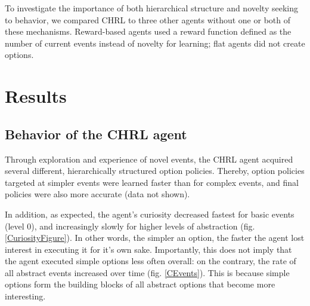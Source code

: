 \documentclass{article}
\begin{document}
To investigate the importance of both hierarchical structure and novelty seeking to behavior, we compared CHRL to three other agents without one or both of these mechanisms. Reward-based agents used a reward function defined as the number of current events instead of novelty for learning; flat agents did not create options.%


\section{Results}

\subsection{Behavior of the CHRL agent} \label{Results CHRL}

Through exploration and experience of novel events, the CHRL agent acquired several different, hierarchically structured option policies. Thereby, option policies targeted at simpler events were learned faster than for complex events, and final policies were also more accurate (data not shown).

In addition, as expected, the agent's curiosity decreased fastest for basic events (level 0), and increasingly slowly for higher levels of abstraction (fig. \ref{CuriosityFigure}). In other words, the simpler an option, the faster the agent lost interest in executing it for it's own sake. Importantly, this does not imply that the agent executed simple options less often overall: on the contrary, the rate of all abstract events increased over time (fig. \ref{CEvents}). This is because simple options form the building blocks of all abstract options that become more interesting.

\end{document}
